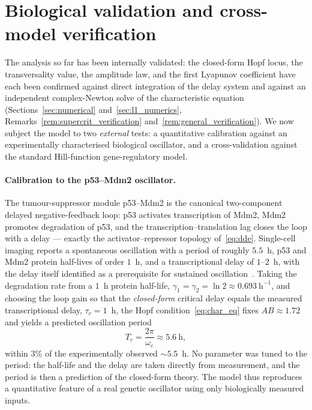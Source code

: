 \documentclass[sn-mathphys,Numbered]{sn-jnl}
\theoremstyle{thmstyleone}
\theoremstyle{thmstyletwo}
\theoremstyle{thmstylethree}
\begin{document}
\section{Biological validation and cross-model verification}
\label{sec:bio_validation}

The analysis so far has been internally validated: the closed-form Hopf
locus, the transversality value, the amplitude law, and the first
Lyapunov coefficient have each been confirmed against direct integration
of the delay system and against an independent complex-Newton solve of
the characteristic equation (Sections~\ref{sec:numerical}
and~\ref{sec:l1_numerics}, Remarks~\ref{rem:supercrit_verification}
and~\ref{rem:general_verification}). We now subject the model to two
\emph{external} tests: a quantitative calibration against an
experimentally characterised biological oscillator, and a
cross-validation against the standard Hill-function gene-regulatory
model.

\paragraph{Calibration to the p53--Mdm2 oscillator.}
The tumour-suppressor module p53--Mdm2 is the canonical two-component
delayed negative-feedback loop: p53 activates transcription of Mdm2,
Mdm2 promotes degradation of p53, and the transcription--translation
lag closes the loop with a delay --- exactly the activator--repressor
topology of~\eqref{eq:dde}. Single-cell imaging reports a spontaneous
oscillation with a period of roughly $5.5$~h, p53 and Mdm2 protein
half-lives of order $1$~h, and a transcriptional delay of $1$--$2$~h,
with the delay itself identified as a prerequisite for sustained
oscillation~\cite{gevazatorsky2006oscillations,levbaror2000generation}. Taking the
degradation rate from a $1$~h protein half-life,
$\gamma_1=\gamma_2=\ln 2\approx0.693~\mathrm{h}^{-1}$, and choosing the
loop gain so that the \emph{closed-form} critical delay equals the
measured transcriptional delay, $\tau_c=1$~h, the Hopf
condition~\eqref{eq:char_eq} fixes $AB\approx1.72$ and yields a
predicted oscillation period
\[
T_c=\frac{2\pi}{\omega_c}\approx 5.6~\text{h},
\]
within $3\%$ of the experimentally observed $\sim5.5$~h. No parameter
was tuned to the period: the half-life and the delay are taken directly
from measurement, and the period is then a prediction of the closed-form
theory. The model thus reproduces a quantitative feature of a real
genetic oscillator using only biologically measured inputs.
\end{document}
